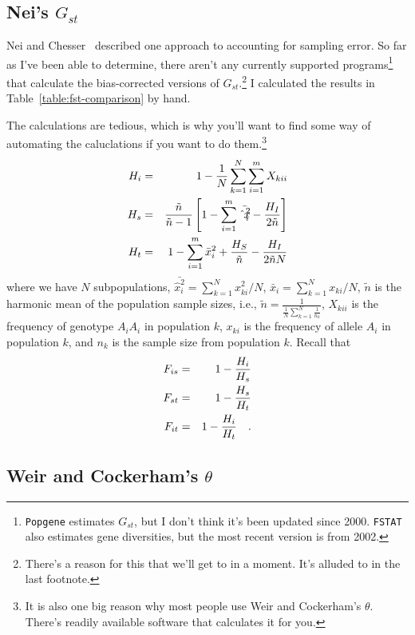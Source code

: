\documentclass[12pt]{article}
\begin{document}
\subsection*{Nei's $G_{st}$}

Nei and Chesser~\cite{Nei-Chesser-1983} described one approach to
accounting for sampling error. So far as I've been able to determine,
there aren't any currently supported programs\footnote{{\tt Popgene}
  estimates $G_{st}$, but I don't think it's been updated since
  2000. {\tt FSTAT} also estimates gene diversities, but the most
  recent version is from 2002.}
that calculate the bias-corrected versions of
$G_{st}$.\footnote{There's a reason for this that we'll get to in a
  moment. It's alluded to in the last footnote.} I calculated the
results in Table~\ref{table:fst-comparison} by hand.

The calculations are tedious, which is why you'll want to find some
way of automating the caluclations if you want to do them.\footnote{It
  is also one big reason why most people use Weir and Cockerham's
  $\theta$. There's readily available software that calculates it for
  you.}
\begin{eqnarray*}
H_{i} &=& 1 - {1 \over N} \sum_{k=1}^{N} \sum_{i=1}^{m} {X_{kii}} \\
H_{s} &=& {\tilde n \over {\tilde n - 1}}
         \left[1 - \sum_{i=1}^{m} {\bar {\hat x_{i}^{2}}} 
         - {H_{I} \over {2 \tilde n}}\right] \\
H_{t} &=& 1 - \sum_{i=1}^{m} {\bar x_{i}^{2}} + {H_{S} \over {\tilde n}}
         - {H_{I} \over {2 \tilde n N}} 
\end{eqnarray*}
where we have $N$ subpopulations, 
${\bar {\hat x_{i}^{2}}} = \sum_{k=1}^{N} {x_{ki}^{2}}/N$, 
${\bar x_{i}} = \sum_{k=1}^{N} x_{ki}/N$, $\tilde n$ 
is the harmonic mean of the population sample sizes, i.e.,
$ \tilde n = \frac{1}{\frac{1}{N} \sum_{k=1}^{N} \frac{1}{n_k}}$, 
$X_{kii}$ is the frequency of genotype $A_{i}A_{i}$ in population $k$,  
$x_{ki}$ is the frequency of allele $A_{i}$ in population $k$, and $n_k$ is
the sample size from population $k$.  Recall that
\begin{eqnarray*}
F_{is} &=& 1 - {H_{i} \over H_{s}} \\
F_{st} &=& 1 - {H_{s} \over H_{t}} \\
F_{it} &=& 1 - {H_{i} \over H_{t}} \quad .
\end{eqnarray*}

\subsection*{Weir and Cockerham's $\theta$}
\end{document}
